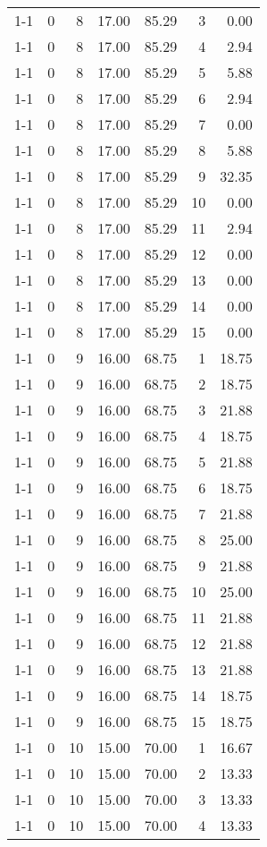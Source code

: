\begin{tabular}{lrrrrrr}
1-1 & 0 & 8 & 17.00 & 85.29 & 3 & 0.00 \\
1-1 & 0 & 8 & 17.00 & 85.29 & 4 & 2.94 \\
1-1 & 0 & 8 & 17.00 & 85.29 & 5 & 5.88 \\
1-1 & 0 & 8 & 17.00 & 85.29 & 6 & 2.94 \\
1-1 & 0 & 8 & 17.00 & 85.29 & 7 & 0.00 \\
1-1 & 0 & 8 & 17.00 & 85.29 & 8 & 5.88 \\
1-1 & 0 & 8 & 17.00 & 85.29 & 9 & 32.35 \\
1-1 & 0 & 8 & 17.00 & 85.29 & 10 & 0.00 \\
1-1 & 0 & 8 & 17.00 & 85.29 & 11 & 2.94 \\
1-1 & 0 & 8 & 17.00 & 85.29 & 12 & 0.00 \\
1-1 & 0 & 8 & 17.00 & 85.29 & 13 & 0.00 \\
1-1 & 0 & 8 & 17.00 & 85.29 & 14 & 0.00 \\
1-1 & 0 & 8 & 17.00 & 85.29 & 15 & 0.00 \\
1-1 & 0 & 9 & 16.00 & 68.75 & 1 & 18.75 \\
1-1 & 0 & 9 & 16.00 & 68.75 & 2 & 18.75 \\
1-1 & 0 & 9 & 16.00 & 68.75 & 3 & 21.88 \\
1-1 & 0 & 9 & 16.00 & 68.75 & 4 & 18.75 \\
1-1 & 0 & 9 & 16.00 & 68.75 & 5 & 21.88 \\
1-1 & 0 & 9 & 16.00 & 68.75 & 6 & 18.75 \\
1-1 & 0 & 9 & 16.00 & 68.75 & 7 & 21.88 \\
1-1 & 0 & 9 & 16.00 & 68.75 & 8 & 25.00 \\
1-1 & 0 & 9 & 16.00 & 68.75 & 9 & 21.88 \\
1-1 & 0 & 9 & 16.00 & 68.75 & 10 & 25.00 \\
1-1 & 0 & 9 & 16.00 & 68.75 & 11 & 21.88 \\
1-1 & 0 & 9 & 16.00 & 68.75 & 12 & 21.88 \\
1-1 & 0 & 9 & 16.00 & 68.75 & 13 & 21.88 \\
1-1 & 0 & 9 & 16.00 & 68.75 & 14 & 18.75 \\
1-1 & 0 & 9 & 16.00 & 68.75 & 15 & 18.75 \\
1-1 & 0 & 10 & 15.00 & 70.00 & 1 & 16.67 \\
1-1 & 0 & 10 & 15.00 & 70.00 & 2 & 13.33 \\
1-1 & 0 & 10 & 15.00 & 70.00 & 3 & 13.33 \\
1-1 & 0 & 10 & 15.00 & 70.00 & 4 & 13.33 \\

\end{tabular}
